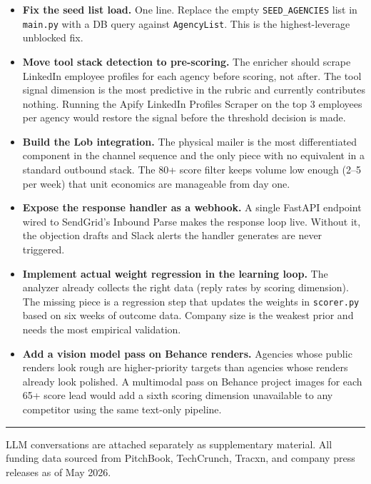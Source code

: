 \documentclass[11pt, letterpaper]{article}
\begin{document}
\begin{itemize}
  \item \textbf{Fix the seed list load.} One line. Replace the empty
    \texttt{SEED\_AGENCIES} list in \texttt{main.py} with a DB query against
    \texttt{AgencyList}. This is the highest-leverage unblocked fix.

  \item \textbf{Move tool stack detection to pre-scoring.} The enricher should
    scrape LinkedIn employee profiles for each agency before scoring, not after.
    The tool signal dimension is the most predictive in the rubric and currently
    contributes nothing. Running the Apify LinkedIn Profiles Scraper on the top
    3 employees per agency would restore the signal before the threshold
    decision is made.

  \item \textbf{Build the Lob integration.} The physical mailer is the most
    differentiated component in the channel sequence and the only piece with no
    equivalent in a standard outbound stack. The 80+ score filter keeps volume
    low enough (2--5 per week) that unit economics are manageable from day one.

  \item \textbf{Expose the response handler as a webhook.} A single FastAPI
    endpoint wired to SendGrid's Inbound Parse makes the response loop live.
    Without it, the objection drafts and Slack alerts the handler generates are
    never triggered.

  \item \textbf{Implement actual weight regression in the learning loop.} The
    analyzer already collects the right data (reply rates by scoring dimension).
    The missing piece is a regression step that updates the weights in
    \texttt{scorer.py} based on six weeks of outcome data. Company size is the
    weakest prior and needs the most empirical validation.

  \item \textbf{Add a vision model pass on Behance renders.} Agencies whose
    public renders look rough are higher-priority targets than agencies whose
    renders already look polished. A multimodal pass on Behance project images
    for each 65+ score lead would add a sixth scoring dimension unavailable to
    any competitor using the same text-only pipeline.
\end{itemize}

\vfill
\textcolor{rulegray}{\rule{\linewidth}{0.4pt}}
\begin{center}
  \small\textcolor{midgray}{
    LLM conversations are attached separately as supplementary material.
    All funding data sourced from PitchBook, TechCrunch, Tracxn, and company
    press releases as of May 2026.
  }
\end{center}
\end{document}
